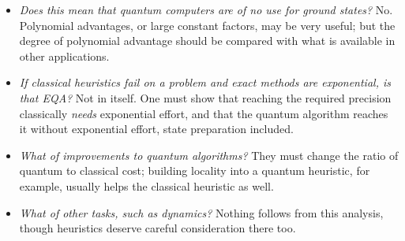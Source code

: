 \documentclass[handoutsbeamer.tex]{subfiles}
\begin{document}
\begin{frame}
\onp{\footnotesize}
\begin{itemize}\setlength\itemsep{0.2em}
    \item \emph{Does this mean that quantum computers are of no use for ground states?} No. Polynomial advantages, or large constant factors, may be very useful; but the degree of polynomial advantage should be compared with what is available in other applications.
    \item \emph{If classical heuristics fail on a problem and exact methods are exponential, is that EQA?} Not in itself. One must show that reaching the required precision classically \emph{needs} exponential effort, and that the quantum algorithm reaches it without exponential effort, state preparation included.
    \item \emph{What of improvements to quantum algorithms?} They must change the ratio of quantum to classical cost; building locality into a quantum heuristic, for example, usually helps the classical heuristic as well.
    \item \emph{What of other tasks, such as dynamics?} Nothing follows from this analysis, though heuristics deserve careful consideration there too.
\end{itemize}
\end{frame}
\end{document}
